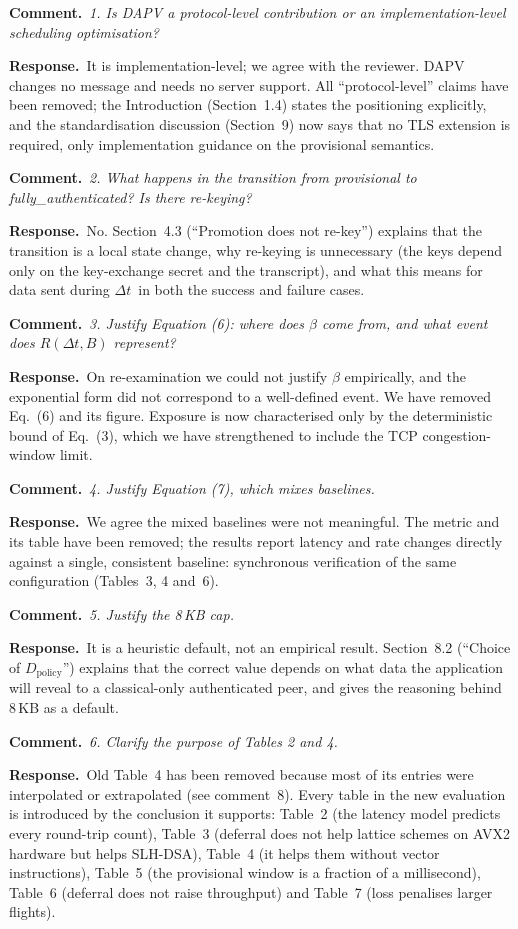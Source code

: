 \documentclass[11pt]{article}
\newcommand{\RC}[1]{\par\medskip\noindent\textcolor{rc}{\textbf{Comment.}}~\textit{#1}\par}
\newcommand{\AR}{\par\noindent\textbf{Response.}~}
\newcommand{\Dt}{\ensuremath{\Delta t}}
\begin{document}
\RC{1. Is DAPV a protocol-level contribution or an implementation-level
scheduling optimisation?}
\AR It is implementation-level; we agree with the reviewer.  DAPV changes
no message and needs no server support.  All ``protocol-level'' claims have
been removed; the Introduction (Section~1.4) states the positioning
explicitly, and the standardisation discussion (Section~9) now says that no
TLS extension is required, only implementation guidance on the provisional
semantics.

\RC{2. What happens in the transition from provisional to
fully\_authenticated?  Is there re-keying?}
\AR No.  Section~4.3 (``Promotion does not re-key'') explains that the
transition is a local state change, why re-keying is unnecessary (the
keys depend only on the key-exchange secret and the transcript), and what
this means for data sent during \Dt\ in both the success and failure
cases.

\RC{3. Justify Equation (6): where does $\beta$ come from, and what event
does $R(\Delta t, B)$ represent?}
\AR On re-examination we could not justify $\beta$ empirically, and the
exponential form did not correspond to a well-defined event.  We have
removed Eq.~(6) and its figure.  Exposure is now characterised only by
the deterministic bound of Eq.~(3), which we have strengthened to include
the TCP congestion-window limit.

\RC{4. Justify Equation (7), which mixes baselines.}
\AR We agree the mixed baselines were not meaningful.  The metric and its
table have been removed; the results report latency and rate changes
directly against a single, consistent baseline: synchronous verification
of the same configuration (Tables~3, 4 and~6).

\RC{5. Justify the 8\,KB cap.}
\AR It is a heuristic default, not an empirical result.  Section~8.2
(``Choice of $D_\text{policy}$'') explains that the correct value depends on
what data the application will reveal to a classical-only authenticated
peer, and gives the reasoning behind 8\,KB as a default.

\RC{6. Clarify the purpose of Tables 2 and 4.}
\AR Old Table~4 has been removed because most of its entries were
interpolated or extrapolated (see comment~8).  Every table in the new
evaluation is introduced by the conclusion it supports: Table~2 (the
latency model predicts every round-trip count), Table~3 (deferral does not
help lattice schemes on AVX2 hardware but helps SLH-DSA), Table~4 (it helps
them without vector instructions), Table~5 (the provisional window is a
fraction of a millisecond), Table~6 (deferral does not raise throughput)
and Table~7 (loss penalises larger flights).
\end{document}

